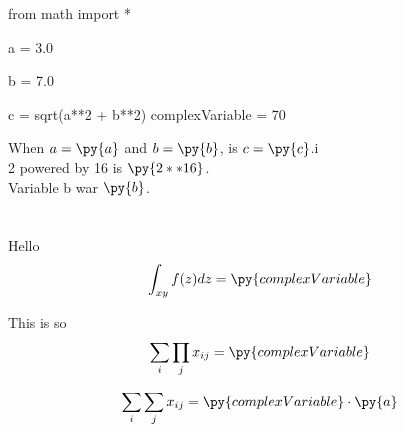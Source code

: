 \documentclass{article}
\begin{document}
\begin{pycode}
from math import *

a = 3.0

b = 7.0

c = sqrt(a**2 + b**2)
complexVariable = 70
\end{pycode}






When $a = \py{a}$ and $b = \py{b}$, is  $c = \py{c}$.i\\%
2 powered by 16 is $\py{2**16}$.\\%
Variable b war $\py{b}$.\\%
\\
\\
Hello
\begin{equation*}
\int_{xy} f(z) dz = \py{complexVariable}%
\end{equation*}

This is so
\begin{eqnarray*}
  \sum_i \prod_j x_{ij} = \py{complexVariable}%
\end{eqnarray*}

\begin{eqnarray*}
  \sum_i \sum_j x_{ij} = \py{complexVariable}\cdot\py{a}%
\end{eqnarray*}
\end{document}
